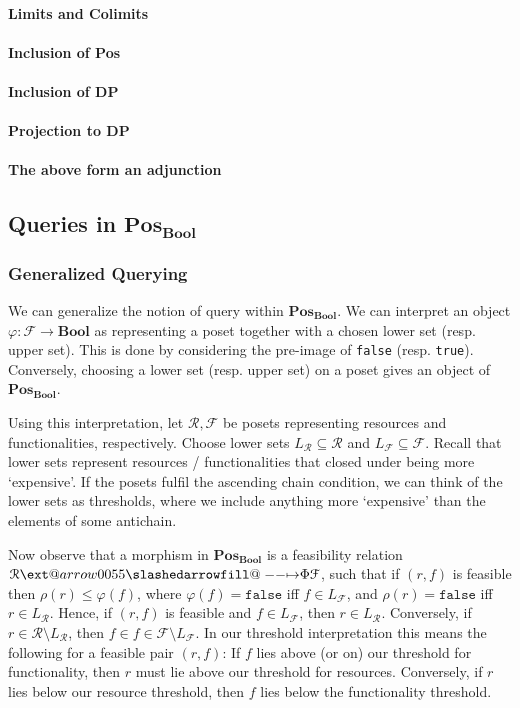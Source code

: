 \documentclass[12pt]{article}
\makeatletter
\theoremstyle{definition}
\theoremstyle{plain}
\theoremstyle{plain}
\theoremstyle{plain}
\theoremstyle{plain}
\theoremstyle{remark}
\theoremstyle{remark}
\newcommand{\mc}[1]{\mathcal{#1}}
\newcommand{\sub}{\subseteq}
\def\slashedarrowfill@#1#2#3#4#5{%
	$\m@th\thickmuskip0mu\medmuskip\thickmuskip\thinmuskip\thickmuskip
	\relax#5#1\mkern-7mu%
	\cleaders\hbox{$#5\mkern-2mu#2\mkern-2mu$}\hfill
	\mathclap{#3}\mathclap{#2}%
	\cleaders\hbox{$#5\mkern-2mu#2\mkern-2mu$}\hfill
	\mkern-7mu#4$%
}
\def\rightslashedarrowfill@{%
	\slashedarrowfill@\relbar\relbar\mapstochar\rightarrow}
\newcommand\xslashedrightarrow[2][]{%
	\ext@arrow 0055{\rightslashedarrowfill@}{#1}{#2}}
\makeatother
\begin{document}
\paragraph{Limits and Colimits}

\paragraph{Inclusion of Pos}

\paragraph{Inclusion of DP}

\paragraph{Projection to DP}

\paragraph{The above form an adjunction}

\subsection{Queries in $\mathbf{Pos_{Bool}}$}

\subsubsection{Generalized Querying} \label{gen queries}
We can generalize the notion of query within $\mathbf{Pos_{Bool}}$. We can interpret an object $\varphi: \mc{F} \rightarrow \mathbf{Bool}$ as representing a poset together with a chosen lower set (resp. upper set). This is done by considering the pre-image of \texttt{false} (resp. \texttt{true}). Conversely, choosing a lower set (resp. upper set) on a poset gives an object of $\mathbf{Pos_{Bool}}$. 

Using this interpretation, let $\mc{R}, \mc{F}$ be posets representing resources and functionalities, respectively. Choose lower sets $L_\mc{R} \sub \mc{R}$ and $L_\mc{F} \sub \mc{F}$. Recall that lower sets represent resources / functionalities that closed under being more `expensive'. If the posets fulfil the ascending chain condition, we can think of the lower sets as thresholds, where we include anything more `expensive' than the elements of some antichain. 

Now observe that a morphism in  $\mathbf{Pos_{Bool}}$ is a feasibility relation $\mc{R} \xslashedrightarrow{\Phi} \mc{F}$, such that if $(r,f)$ is feasible then $\rho(r) \leq \varphi(f)$, where $\varphi(f) = \mathtt{false}$ iff $f \in L_\mc{F}$, and $\rho(r) = \mathtt{false}$ iff $r \in L_\mc{R}$. Hence, if $(r,f)$ is feasible and $f \in L_\mc{F}$, then $r \in L_\mc{R}$. Conversely, if $r \in  \mc{R} \setminus L_\mc{R}$, then $f \in f \in \mc{F} \setminus L_\mc{F}$. In our threshold interpretation this means the following for a feasible pair $(r,f)$: If $f$ lies above (or on) our threshold for functionality, then $r$ must lie above our threshold for resources. Conversely, if $r$ lies below our resource threshold, then $f$ lies below the functionality threshold.
\end{document}
